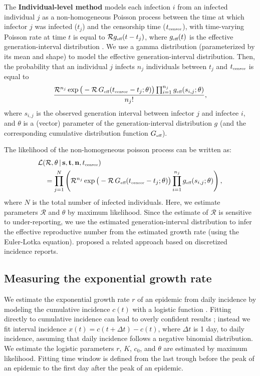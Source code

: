 \documentclass[12pt]{article}
\newcommand{\RR}{\ensuremath{{\mathcal R}}}
\newcommand{\tsub}[2]{#1_{{\textrm{\tiny #2}}}}
\begin{document}
The \textbf{Individual-level method} models each infection $i$ from an infected individual $j$ as a non-homogeneous Poisson process between the time at which infector $j$ was infected ($t_j$) and the censorship time ($\tsub{t}{censor}$), with time-varying Poisson rate at time $t$ is equal to $\RR \tsub{g}{eff}(t - t_j)$, where $\tsub{g}{eff}(t)$ is the effective generation-interval distribution \citep{daley2007introduction}.
We use a gamma distribution (parameterized by its mean and shape) to model the effective generation-interval distribution.
Then, the probability that an individual $j$ infects $n_j$ individuals between $t_j$ and $\tsub{t}{censor}$ is equal to
\begin{equation}
\frac{\RR^{n_j} \exp \big(- \RR\, \tsub{G}{eff}(\tsub{t}{censor} - t_j ;\theta) \big) \prod_{i=1}^{n_j} \tsub{g}{eff}(s_{i, j}; \theta)}{n_j!},
\end{equation}
where $s_{i,j}$ is the observed generation interval between infector $j$ and infectee $i$, and $\theta$ is a (vector) parameter of the generation-interval distribution $g$ (and the corresponding cumulative distribution function $\tsub{G}{eff}$).

The likelihood of the non-homogeneous poisson process can be written as:
\begin{equation}\label{eq:nonhomogeneous}
\begin{aligned}
&\mathcal{L}(\RR, \theta\,|\, \mathbf{s}, \mathbf{t}, \mathbf{n}, \tsub{t}{censor})\\
&\quad=\prod_{j=1}^N \left(\RR^{n_j} \exp \big(- \RR \, \tsub{G}{eff}(\tsub{t}{censor} - t_j ;\theta) \big) \prod_{i=1}^{n_j} \tsub{g}{eff}(s_{i, j}; \theta) \right),
\end{aligned}
\end{equation}
where $N$ is the total number of infected individuals.
Here, we estimate parameters $\RR$ and $\theta$ by maximum likelihood.
Since the estimate of $\RR$ is sensitive to under-reporting, we use the estimated generation-interval distribution to infer the effective reproductive number from the estimated growth rate (using the Euler-Lotka equation).
\cite{forsberg2008likelihood} proposed a related approach based on discretized incidence reports.

\subsection{Measuring the exponential growth rate}

We estimate the exponential growth rate $r$ of an epidemic from daily incidence by modeling the cumulative incidence $c(t)$ with a logistic function \citep{ma2014estimating}. 
Fitting directly to cumulative incidence can lead to overly confident results \citep{king2015avoidable}; instead we fit interval incidence $x(t) = c(t + \Delta t) - c(t)$, where $\Delta t$ is 1 day, to daily incidence, assuming that daily incidence follows a negative binomial distribution. 
We estimate the logistic parameters $r$, $K$, $c_0$, and $\theta$ are estimated by maximum likelihood.
Fitting time window is defined from the last trough before the peak of an epidemic to the first day after the peak of an epidemic.
\end{document}
